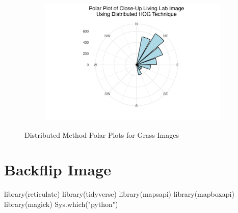 \documentclass[
  letterpaper,
  DIV=11,
  numbers=noendperiod]{scrreprt}
\newenvironment{Shaded}{\begin{snugshade}}{\end{snugshade}}
\newcommand{\FunctionTok}[1]{\textcolor[rgb]{0.28,0.35,0.67}{#1}}
\newcommand{\NormalTok}[1]{\textcolor[rgb]{0.00,0.23,0.31}{#1}}
\newcommand{\StringTok}[1]{\textcolor[rgb]{0.13,0.47,0.30}{#1}}
\begin{document}
\begin{figure}
\begin{minipage}{0.33\linewidth}
\begin{figure}[H]
{}


\end{figure}%

\end{minipage}%
%
\begin{minipage}{0.33\linewidth}

\begin{figure}[H]

{\centering \includegraphics{images/plots/grass/close_up_living_lab_contribution_polar_plot.jpg}

}


\end{figure}%

\end{minipage}%

\caption{\label{fig-grass-distributed-polar}Distributed Method Polar
Plots for Grass Images}

\end{figure}%

\chapter{Backflip Image}\label{backflip-image}

\begin{Shaded}
\begin{Highlighting}[]
\FunctionTok{library}\NormalTok{(reticulate)}
\FunctionTok{library}\NormalTok{(tidyverse)}
\FunctionTok{library}\NormalTok{(mapsapi)}
\FunctionTok{library}\NormalTok{(mapboxapi)}
\FunctionTok{library}\NormalTok{(magick)}
\FunctionTok{Sys.which}\NormalTok{(}\StringTok{"python"}\NormalTok{)}
\end{Highlighting}
\end{Shaded}
\end{document}
